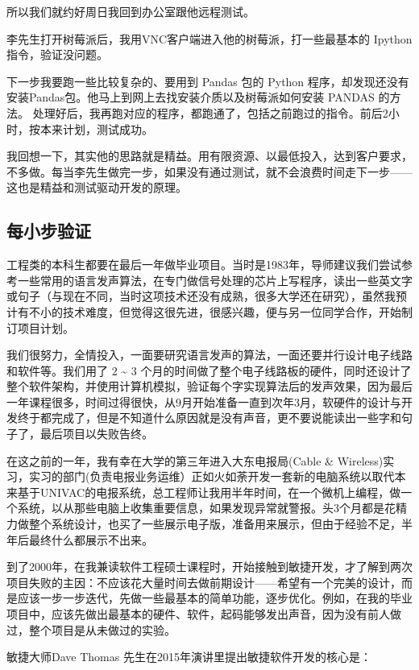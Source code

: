 所以我们就约好周日我回到办公室跟他远程测试。

李先生打开树莓派后，我用VNC客户端进入他的树莓派，打一些最基本的 Ipython
指令，验证没问题。

下一步我要跑一些比较复杂的、要用到 Pandas 包的 Python
程序，却发现还没有安装Pandas包。他马上到网上去找安装介质以及树莓派如何安装
PANDAS 的方法。
处理好后，我再跑对应的程序，都跑通了，包括之前跑过的指令。前后2小时，按本来计划，测试成功。

我回想一下，其实他的思路就是精益。用有限资源、以最低投入，达到客户要求，不多做。每当李先生做完一步，如果没有通过测试，就不会浪费时间走下一步------这也是精益和测试驱动开发的原理。

\hypertarget{ux6bcfux5c0fux6b65ux9a8cux8bc1}{%
\subsection{每小步验证}\label{ux6bcfux5c0fux6b65ux9a8cux8bc1}}

工程类的本科生都要在最后一年做毕业项目。当时是1983年，导师建议我们尝试参考一些常用的语言发声算法，在专门做信号处理的芯片上写程序，读出一些英文字或句子（与现在不同，当时这项技术还没有成熟，很多大学还在研究），虽然我预计有不小的技术难度，但觉得这很先进，很感兴趣，便与另一位同学合作，开始制订项目计划。

我们很努力，全情投入，一面要研究语言发声的算法，一面还要并行设计电子线路和软件等。我们用了
2 \textasciitilde{} 3
个月的时间做了整个电子线路板的硬件，同时还设计了整个软件架构，并使用计算机模拟，验证每个字实现算法后的发声效果，因为最后一年课程很多，时间过得很快，从9月开始准备一直到次年3月，软硬件的设计与开发终于都完成了，但是不知道什么原因就是没有声音，更不要说能读出一些字和句子了，最后项目以失败告终。

在这之前的一年，我有幸在大学的第三年进入大东电报局(Cable \&
Wireless)实习，实习的部门(负责电报业务运维）正如火如荼开发一套新的电脑系统以取代本来基于UNIVAC的电报系统，总工程师让我用半年时间，在一个微机上编程，做一个系统，以从那些电脑上收集重要信息，如果发现异常就警报。头3个月都是花精力做整个系统设计，也买了一些展示电子版，准备用来展示，但由于经验不足，半年后最终什么都展示不出来。

到了2000年，在我兼读软件工程硕士课程时，开始接触到敏捷开发，才了解到两次项目失败的主因：不应该花大量时间去做前期设计------希望有一个完美的设计，而是应该一步一步迭代，先做一些最基本的简单功能，逐步优化。例如，在我的毕业项目中，应该先做出最基本的硬件、软件，起码能够发出声音，因为没有前人做过，整个项目是从未做过的实验。

敏捷大师Dave Thomas 先生在2015年演讲里提出敏捷软件开发的核心是：

